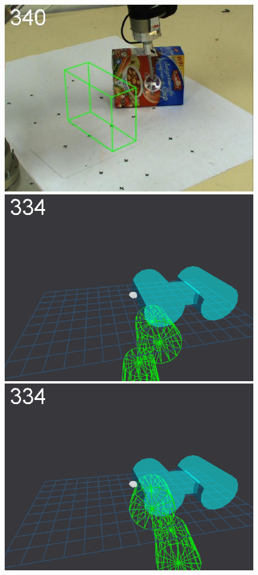 \begin{figure}[t]
{\includegraphics[width=\imgCXwid]{images/C1_LWPR1_87_5}
\includegraphics[width=\imgCXwid]{images/C5_1exp_6_5}
\includegraphics[width=\imgCXwid]{images/C5_2exp_6_5}
}
\end{figure}
